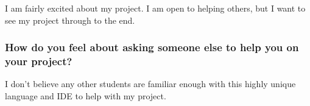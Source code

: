 \documentclass[letterpaper]{article}            %
\begin{document}
I am fairly excited about my project. I am open to helping others, but I want to see my project through to the end.

\subsubsection{How do you feel about asking someone else to help you on your project?}

I don't believe any other students are familiar enough with this highly unique language and IDE to help with my project.
\end{document}
